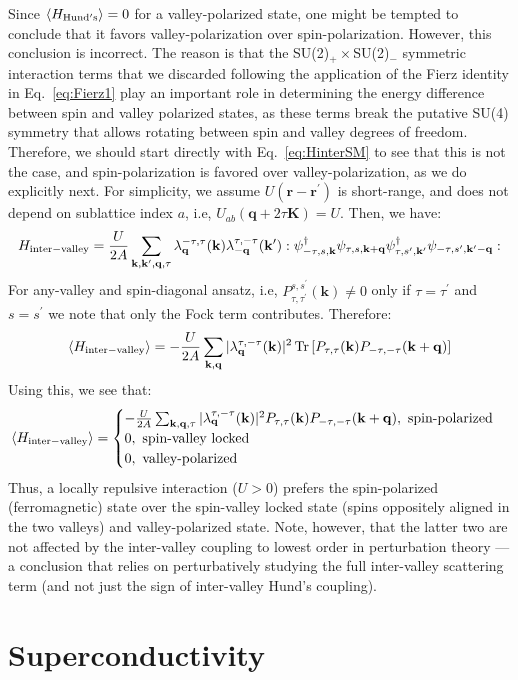 \documentclass[aps,pra,twocolumn,superscriptaddress,10pt,article,nofootinbib,showpacs,longbibliography]{revtex4-1}
\def \k{{\mathbf k}}
\def \q{{\mathbf q}}
\def \r{{\mathbf r}}
\def \rp{{\mathbf r}^\prime}
\def \K{{\mathbf K}}
\def \beq{\begin{eqnarray}}
\def \eeq{\end{eqnarray}}
\begin{document}
Since $\langle H_{\rm Hund's} \rangle = 0$ for a valley-polarized state, one might be tempted to conclude that it favors valley-polarization over spin-polarization.
However, this conclusion is incorrect.
The reason is that the SU(2)$_+ \times$SU(2)$_-$ symmetric interaction terms that we discarded following the application of the Fierz identity in Eq.~\eqref{eq:Fierz1} play an important role in determining the energy difference between spin and valley polarized states, as these terms break the putative SU(4) symmetry that allows rotating between spin and valley degrees of freedom.
Therefore, we should start directly with Eq.~\eqref{eq:HinterSM} to see that this is not the case, and spin-polarization is favored over valley-polarization, as we do explicitly next.
For simplicity, we assume $U(\r - \rp)$ is short-range, and does not depend on sublattice index $a$, i.e, $ U_{ab} (\q + 2 \tau \K) = U$. 
Then, we have:
\beq
H_{\rm inter-valley} = \frac{U}{2A} \sum_{\k, \k^\prime, \q, \tau} \lambda^{-\tau,\tau}_{\q}(\k) \lambda^{\tau,-\tau}_{-\q}(\k^\prime) :\psi^\dagger_{-\tau,s,\k} \psi_{\tau, s, \k + \q} \psi^\dagger_{\tau, s^\prime, \k^\prime} \psi_{-\tau, s^\prime, \k^\prime - \q} :
\eeq
For any-valley and spin-diagonal ansatz, i.e, $P^{s,s^\prime}_{\tau,\tau^\prime}(\k) \neq 0$ only if $\tau = \tau^\prime$ and $s = s^\prime$ we note that only the Fock term contributes. Therefore:
\beq
\langle H_{\rm inter-valley} \rangle =  -\frac{U}{2A} \sum_{\k, \q} |\lambda^{\tau,-\tau}_\q(\k)|^2 \Tr\left[ P_{\tau,\tau}(\k) P_{-\tau,-\tau}(\k + \q) \right]
\eeq
Using this, we see that:
\beq
\langle H_{\rm inter-valley} \rangle = \begin{cases}  - \frac{U}{2A} \sum_{\k, \q, \tau} |\lambda^{\tau,-\tau}_\q(\k)|^2 P_{\tau,\tau}(\k) P_{-\tau, -\tau}(\k + \q), \text{ spin-polarized} \\ 0, \text{ spin-valley locked} \\ 0, \text{ valley-polarized}   \end{cases}
\eeq
Thus, a locally repulsive interaction ($U > 0$) prefers the spin-polarized (ferromagnetic) state over the spin-valley locked state (spins oppositely aligned in the two valleys) and valley-polarized state. 
Note, however, that the latter two are not affected by the inter-valley coupling to lowest order in perturbation theory --- a conclusion that relies on perturbatively studying the full inter-valley scattering term (and not just the sign of inter-valley Hund's coupling). 

\section{Superconductivity}
\end{document}
